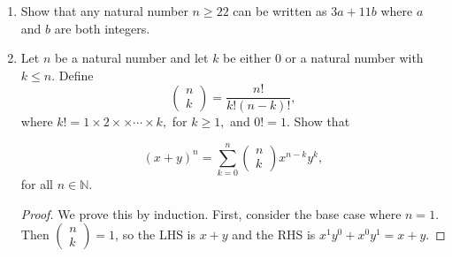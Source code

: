 \documentclass[11pt]{article}
\newcommand{\bbN}{\mathbb{N}}
\begin{document}
\begin{enumerate}
\begin{proof}[Direct Proof (Algebraic)]
This completes the proof.

\renewcommand\qedsymbol{QED}

\end{proof}

More generally, show that if $x\neq 1$ is a real number and $n$ is a natural number, then
\begin{align*}
  1 + x + x^2 + \cdots + x^{n-1} = \frac{x^n - 1}{x - 1}.
\end{align*}

\begin{proof}

We prove this by induction. First consider the base case for $n = 1$. Then, the LHS = 1 and the RHS = $\frac{x-1}{x-1} = 1$. 

Next, we want to show that
\[
    x^0 + x^1 + x^2 + \dots + x^{n-1} + x^n
= \frac{x^{n+1} - 1}{x-1}.
\]

By the inductive hypothesis, the above is equivalent to
\[
    \frac{x^n - 1}{x - 1} + x^n = \frac{x^{n+1} - 1}{x-1}.
\]

Hence, we want to show that
\[
    x^n = \frac{(x^{n+1} - 1) - (x^{n} - 1)}{x-1}.
\]

The RHS simplifies to
\[
    \frac{x^{n+1} - x^n}{x-1} = \frac{x^n(x-1)}{x-1} = x^n.
\]

Hence, expression for LHS is equivalent to the expression for RHS. This completes the proof.

\renewcommand\qedsymbol{QED}

\end{proof}

\item Show that any natural number $n\geq 22$
can
be written
as $3a+11b$
where $a$ and $b$ are both integers.

\item Let $n$ be a natural number and let $k$ be either $0$ or a natural number with $k\leq n.$ Define
$$ \left(\begin{array}{c} n\\ k\end{array}\right)=\frac{n!}{k!(n-k)!},$$
where $k!=1\times 2\times\times\cdots \times k,$ for $k\geq 1,$ and $0!=1.$ 
Show that 

$$
(x+y)^n  = \sum_{k=0}^n  \left(\begin{array}{c} n\\ k\end{array}\right) x^{n-k}y^k,$$
for all $n\in\bbN.$

\begin{proof}
We prove this by induction. First, consider the base case where $n=1$. Then $\left(\begin{array}{c} n\\ k\end{array}\right) = 1$, so the LHS is $x+y$ and the RHS is $x^{1}y^{0} + x^{0}y^{1} = x + y$.


\end{proof}
\end{enumerate}
\end{document}
